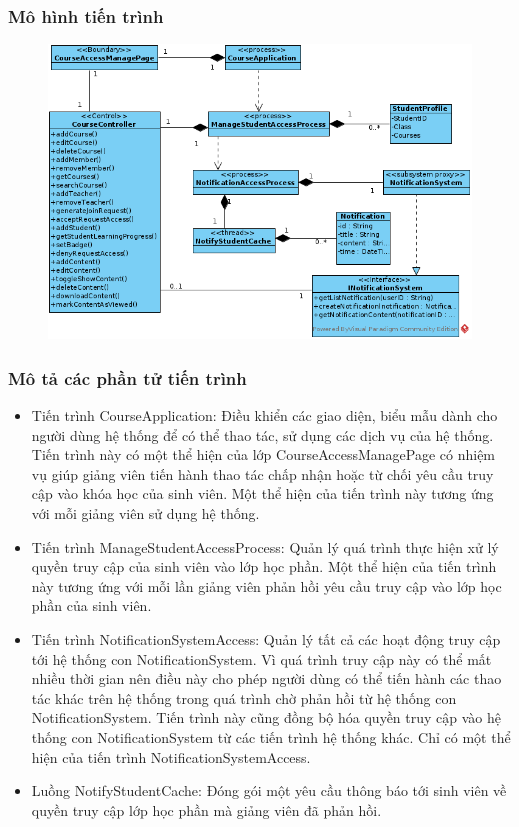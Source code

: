\documentclass[./../main_file.tex]{subfiles}
\begin{document}
\subsubsection{Mô hình tiến trình}

\begin{figure}[H]
	\centering
	\includegraphics[width=\linewidth]{./images/pv_manage_studentactivity.png}
\end{figure}

\subsubsection{Mô tả các phần tử tiến trình}
\begin{itemize}
	\item Tiến trình CourseApplication: Điều khiển các giao diện, biểu mẫu dành cho người dùng hệ thống để có thể thao tác, sử dụng các dịch vụ của hệ thống. Tiến trình này có một thể hiện của lớp CourseAccessManagePage có nhiệm vụ giúp giảng viên tiến hành thao tác chấp nhận hoặc từ chối yêu cầu truy cập vào khóa học của sinh viên.
	Một thể hiện của tiến trình này tương ứng với mỗi giảng viên sử dụng hệ thống.
	\item Tiến trình ManageStudentAccessProcess: Quản lý quá trình thực hiện xử lý quyền truy cập của sinh viên vào lớp học phần.
	Một thể hiện của tiến trình này tương ứng với mỗi lần giảng viên phản hồi yêu cầu truy cập vào lớp học phần của sinh viên.
	\item Tiến trình NotificationSystemAccess: Quản lý tất cả các hoạt động truy cập tới hệ thống con NotificationSystem. Vì quá trình truy cập này có thể mất nhiều thời gian nên điều này cho phép người dùng có thể tiến hành các thao tác khác trên hệ thống trong quá trình chờ phản hồi từ hệ thống con NotificationSystem. Tiến trình này cũng đồng bộ hóa quyền truy cập vào hệ thống con NotificationSystem từ các tiến trình hệ thống khác.
	Chỉ có một thể hiện của tiến trình NotificationSystemAccess.
	\item Luồng NotifyStudentCache: Đóng gói một yêu cầu thông báo tới sinh viên về quyền truy cập lớp học phần mà giảng viên đã phản hồi.
\end{itemize}
\end{document}
